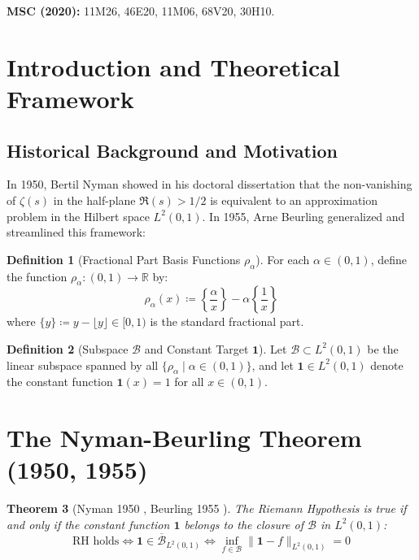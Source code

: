 \documentclass[11pt,a4paper]{article}
\newtheorem{theorem}{Theorem}[section]
\theoremstyle{definition}
\newtheorem{definition}[theorem]{Definition}
\begin{document}
\noindent\textbf{MSC (2020):} 11M26, 46E20, 11M06, 68V20, 30H10.

\tableofcontents
\newpage

\section{Introduction and Theoretical Framework}

\subsection{Historical Background and Motivation}
In 1950, Bertil Nyman \cite{nyman1950} showed in his doctoral dissertation that the non-vanishing of $\zeta(s)$ in the half-plane $\Re(s) > 1/2$ is equivalent to an approximation problem in the Hilbert space $L^2(0, 1)$.
In 1955, Arne Beurling \cite{beurling1955} generalized and streamlined this framework:

\begin{definition}[Fractional Part Basis Functions $\rho_\alpha$]\label{def:rho_alpha}
For each $\alpha \in (0, 1)$, define the function $\rho_\alpha : (0, 1) \to \mathbb{R}$ by:
\begin{equation}\label{eq:rho_alpha_def}
\rho_\alpha(x) \coloneqq \left\{ \frac{\alpha}{x} \right\} - \alpha \left\{ \frac{1}{x} \right\}
\end{equation}
where $\{y\} \coloneqq y - \lfloor y \rfloor \in [0, 1)$ is the standard fractional part.
\end{definition}

\begin{definition}[Subspace $\mathcal{B}$ and Constant Target $\mathbf{1}$]\label{def:nyman_subspace}
Let $\mathcal{B} \subset L^2(0, 1)$ be the linear subspace spanned by all $\{\rho_\alpha \mid \alpha \in (0, 1)\}$, and let $\mathbf{1} \in L^2(0, 1)$ denote the constant function $\mathbf{1}(x) = 1$ for all $x \in (0, 1)$.
\end{definition}

\section{The Nyman-Beurling Theorem (1950, 1955)}

\begin{theorem}[Nyman 1950 \cite{nyman1950}, Beurling 1955 \cite{beurling1955}]\label{thm:nyman_beurling}
The Riemann Hypothesis is true if and only if the constant function $\mathbf{1}$ belongs to the closure of $\mathcal{B}$ in $L^2(0, 1)$:
\begin{equation}\label{eq:nb_equiv}
\text{RH holds} \iff \mathbf{1} \in \overline{\mathcal{B}}_{L^2(0, 1)} \iff \inf_{f \in \mathcal{B}} \| \mathbf{1} - f \|_{L^2(0, 1)} = 0
\end{equation}
\end{theorem}
\end{document}
